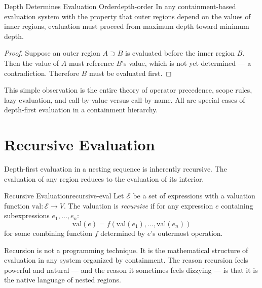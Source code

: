 \begin{proposition}{Depth Determines Evaluation Order}{depth-order}
  In any containment-based evaluation system with the property that
  outer regions depend on the values of inner regions, evaluation
  must proceed from maximum depth toward minimum depth.
\end{proposition}

\begin{proof}
  Suppose an outer region $A \supset B$ is evaluated before the inner
  region $B$. Then the value of $A$ must reference $B$'s value, which
  is not yet determined — a contradiction. Therefore $B$ must be
  evaluated first.
\end{proof}

This simple observation is the entire theory of operator precedence,
scope rules, lazy evaluation, and call-by-value versus call-by-name.
All are special cases of depth-first evaluation in a containment hierarchy.

\section{Recursive Evaluation}

Depth-first evaluation in a nesting sequence is inherently recursive. The
evaluation of any region reduces to the evaluation of its interior.

\begin{definition}{Recursive Evaluation}{recursive-eval}
  Let $\mathcal{E}$ be a set of expressions with a valuation function
  $\mathrm{val} : \mathcal{E} \to V$. The valuation is \emph{recursive}
  if for any expression $e$ containing subexpressions $e_1, \ldots, e_n$:
  \[
    \mathrm{val}(e) = f(\mathrm{val}(e_1), \ldots, \mathrm{val}(e_n))
  \]
  for some combining function $f$ determined by $e$'s outermost operation.
\end{definition}

Recursion is not a programming technique. It is the mathematical structure
of evaluation in any system organized by containment. The reason recursion
feels powerful and natural — and the reason it sometimes feels dizzying —
is that it is the native language of nested regions.

